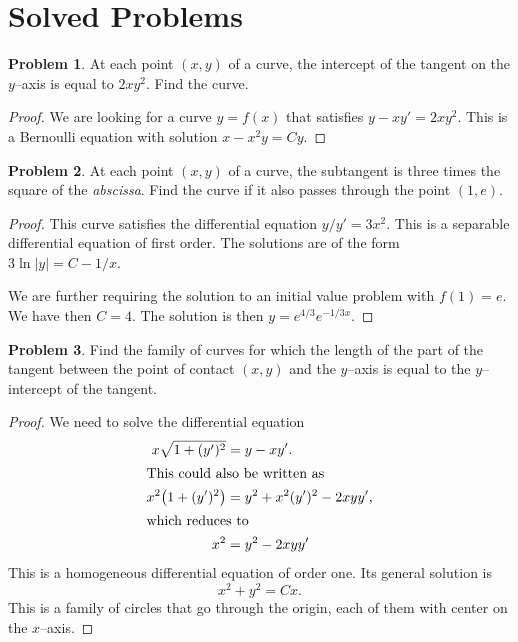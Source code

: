 \documentclass{scrartcl}
\theoremstyle{definition}
\newtheorem*{problem*}{Problem}
\begin{document}
\section*{Solved Problems}
\begin{problem*}
At each point $(x,y)$ of a curve, the intercept of the tangent on the $y$--axis is equal to $2xy^2$.  Find the curve.
\end{problem*}


\begin{proof}
We are looking for a curve $y=f(x)$ that satisfies $y-xy'=2xy^2$.  This is a Bernoulli equation with solution $x-x^2y=Cy$.
\end{proof}

\begin{problem*}
At each point $(x,y)$ of a curve, the subtangent is three times the square of the \emph{abscissa}.  Find the curve if it also passes through the point $(1,e)$.
\end{problem*}

\begin{proof}
This curve satisfies the differential equation $y/y'=3x^2$.  This is a separable differential equation of first order.  The solutions are of the form $3\ln \lvert y \rvert = C- 1/x$.

We are further requiring the solution to an initial value problem with $f(1)=e$.  We have then $C=4$.  The solution is then $y = e^{4/3} e^{-1/3x}$.
\end{proof}


\begin{problem*}
Find the family of curves for which the length of the part of the tangent between the point of contact $(x,y)$ and the $y$--axis is equal to the $y$--intercept of the tangent.  
\end{problem*}
\begin{proof}
We need to solve the differential equation
\begin{align*}
x\sqrt{1+(y')^2} &= y-xy'. \\
\intertext{This could also be written as}
x^2 \big( 1 + (y')^2 \big) &= y^2 + x^2(y')^2 - 2xyy', \\
\intertext{which reduces to}
x^2 &= y^2 -2xyy'
\end{align*}
This is a homogeneous differential equation of order one.  Its general solution is
\begin{equation*}
x^2+y^2=Cx.
\end{equation*}
This is a family of circles that go through the origin, each of them with center on the $x$--axis.
\end{proof}
\end{document}
